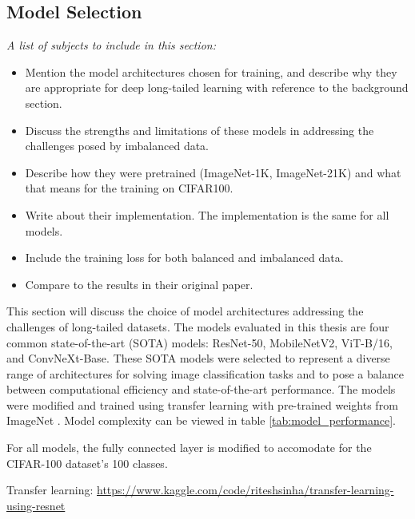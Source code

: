 \subsection{Model Selection}
\label{sec:model_selection}
\textit{A list of subjects to include in this section:}

\begin{itemize}
    \item Mention the model architectures chosen for training, and describe why they are appropriate for deep long-tailed learning with reference to the background section.
    \item Discuss the strengths and limitations of these models in addressing the challenges posed by imbalanced data.
    \item Describe how they were pretrained (ImageNet-1K, ImageNet-21K) and what that means for the training on CIFAR100.
    \item Write about their implementation. The implementation is the same for all models. 
    \item Include the training loss for both balanced and imbalanced data.
    \item Compare to the results in their original paper. 
\end{itemize}

This section will discuss the choice of model architectures addressing the challenges of long-tailed datasets. The models evaluated in this thesis are four common state-of-the-art (SOTA) models: ResNet-50, MobileNetV2, ViT-B/16, and ConvNeXt-Base. These SOTA models were selected to represent a diverse range of architectures for solving image classification tasks and to pose a balance between computational efficiency and state-of-the-art performance. The models were modified and trained using transfer learning with pre-trained weights from ImageNet \cite{ILSVRC15}. Model complexity can be viewed in table \ref{tab:model_performance}.

For all models, the fully connected layer is modified to accomodate for the CIFAR-100 dataset's 100 classes.

Transfer learning:
\url{https://www.kaggle.com/code/riteshsinha/transfer-learning-using-resnet}

